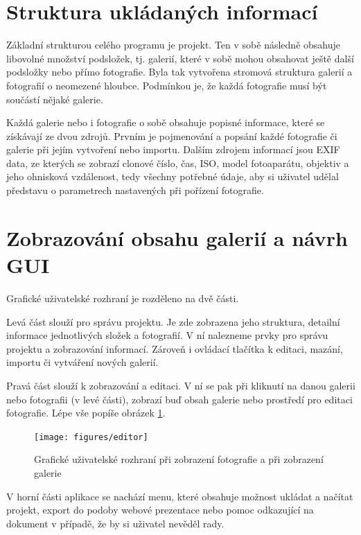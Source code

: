 \documentclass[11pt,twoside,a4paper]{book}
\begin{document}
\section{Struktura ukládaných informací}
\noindent
Základní strukturou celého programu je projekt. Ten v sobě následně obsahuje libovolné množství podsložek, tj. galerií, které v sobě mohou obsahovat ještě další podsložky nebo přímo fotografie. Byla tak vytvořena stromová struktura galerií a fotografií o neomezené hloubce. Podmínkou je, že každá fotografie musí být součástí nějaké galerie.

\indent
Každá galerie nebo i fotografie o sobě obsahuje popisné informace, které se získávají ze dvou zdrojů. Prvním je pojmenování a popsání každé fotografie či galerie při jejím vytvoření nebo importu. Dalším zdrojem informací jsou EXIF data, ze kterých se zobrazí clonové číslo, čas, ISO, model fotoaparátu, objektiv a jeho ohnisková vzdálenost, tedy všechny potřebné údaje, aby si uživatel udělal představu o parametrech nastavených při pořízení fotografie.

\section{Zobrazování obsahu galerií a návrh GUI}
\noindent
Grafické uživatelské rozhraní je rozděleno na dvě části.

\indent
Levá část slouží pro správu projektu. Je zde zobrazena jeho struktura, detailní informace jednotlivých složek a fotografií. V ní nalezneme prvky pro správu projektu a zobrazování informací. Zároveň i ovládací tlačítka k editaci, mazání, importu či vytváření nových galerií. 

Pravá část slouží k zobrazování a editaci. V ní se pak při kliknutí na danou galerii nebo fotografii (v levé části), zobrazí buď obsah galerie nebo prostředí pro editaci fotografie. Lépe vše popíše obrázek \ref{fig:editor}.

\begin{figure}[ht]
\begin{center}
\texttt{[image: figures/editor]}
\caption{Grafické uživatelské rozhraní při zobrazení fotografie a při zobrazení galerie}
\label{fig:editor}
\end{center}
\end{figure}

\indent
V horní části aplikace se nachází menu, které obsahuje možnost ukládat a načítat projekt, export do podoby webové prezentace nebo pomoc odkazující na dokument v případě, že by si uživatel nevěděl rady.
\end{document}
